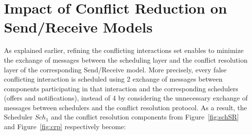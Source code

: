 \section{Impact of Conflict Reduction on Send/Receive Models}
As explained earlier, refining the conflicting interactions set enables to minimize the
exchange of messages between the scheduling layer and the conflict resolution layer
of the corresponding Send/Receive model. More precisely, every false conflicting interaction
is scheduled using 2 exchange of messages between components participating in that interaction
and the corresponding schedulers (offers and notifications), 
instead of 4 by considering the unnecessary exchange of messages between schedulers and 
the conflict resolution protocol.
As a result, the Scheduler $Sch_1$ and the conflict resolution components 
from Figure~\ref{fig:schSR} and Figure~\ref{fig:crp} respectively become:





